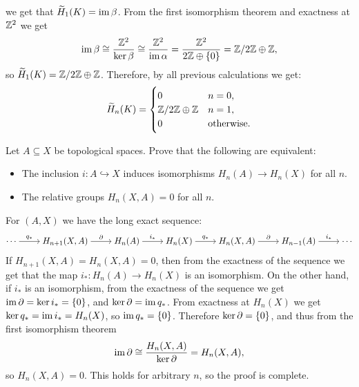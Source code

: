 \documentclass[11pt,a4paper]{article}
\begin{document}
\begin{solution}
\begin{enumerate}
      we get that $\widetilde H_1(K) = \operatorname{im} \beta$.
      From the first isomorphism theorem and exactness at $\mathbb{Z}^2$ we get
      \[
        \operatorname{im} \beta \cong
        \frac{\mathbb{Z}^2}{\ker \beta} \cong
        \frac{\mathbb{Z}^2}{\operatorname{im} \alpha} =
        \frac{\mathbb{Z}^2}{2\mathbb{Z} \oplus \left\{0\right\}} = \mathbb{Z}/2\mathbb{Z} \oplus \mathbb{Z},
      \]
      so $\widetilde H_1(K) = \mathbb{Z}/2\mathbb{Z} \oplus \mathbb{Z}$.
      Therefore, by all previous calculations we get:
      \[
        \widetilde H_n(K) =
        \begin{cases}
          0 & n = 0, \\
          \mathbb{Z}/2\mathbb{Z} \oplus \mathbb{Z} & n = 1, \\
          0 &\text{otherwise}.
        \end{cases}
      \]
  \end{enumerate}
\end{solution}

\begin{exercise}
  Let $A \subseteq X$ be topological spaces.
  Prove that the following are equivalent:
  \begin{itemize}
    \item The inclusion $i \colon A \hookrightarrow X$ induces isomorphisms
      $H_n(A) \to H_n(X)$ for all $n$.
    \item The relative groups $H_n(X,A) = 0$ for all $n$.
  \end{itemize}
\end{exercise}
\begin{solution}
  For $(A,X)$ we have the long exact sequence:
  \[\begin{tikzcd}[ampersand replacement=\&,cramped]
    \cdots \& {H_{n+1}(X,A)} \& {H_n(A)} \& {H_n(X)} \& {H_n(X,A)} \& {H_{n-1}(A)} \& \cdots
    \arrow["{q_*}", from=1-1, to=1-2]
    \arrow["\partial", from=1-2, to=1-3]
    \arrow["{i_*}", from=1-3, to=1-4]
    \arrow["{q_*}", from=1-4, to=1-5]
    \arrow["\partial", from=1-5, to=1-6]
    \arrow["{i_*}", from=1-6, to=1-7]
  \end{tikzcd}\]
  If $H_{n+1}(X,A) = H_n(X,A) = 0$,
  then from the exactness of the sequence we get that the map
  $i_* \colon H_n(A) \to H_n(X)$ is an isomorphism.
  On the other hand, if $i_*$ is an isomorphism,
  from the exactness of the sequence
  we get $\operatorname{im} \partial = \ker i_* = \left\{0\right\}$, and $\ker \partial = \operatorname{im} q_*$.
  From exactness at $H_n(X)$ we get $\ker q_* = \operatorname{im} i_* = H_n(X)$,
  so $\operatorname{im} q_* = \left\{0\right\}$.
  Therefore $\ker \partial = \left\{0\right\}$,
  and thus from the first isomorphism theorem
  \[
    \operatorname{im} \partial \cong
    \frac{H_n(X,A)}{\ker \partial} =
    H_n(X,A),
  \]
  so $H_n(X,A) = 0$.
  This holds for arbitrary $n$, so the proof is complete.
\end{solution}
\end{document}
